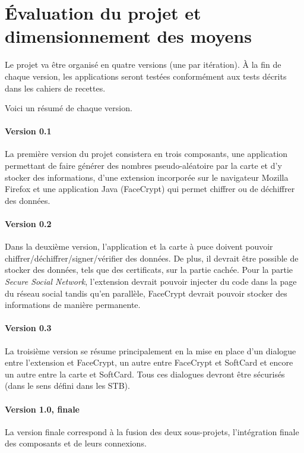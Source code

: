 \documentclass[a4paper,11pt,french]{article}
\begin{document}
\section{Évaluation du projet et dimensionnement des moyens}
Le projet va être organisé en quatre versions (une par itération).
À la fin de chaque version, les applications seront testées 
conformément aux tests décrits dans les cahiers de recettes.

Voici un résumé de chaque version.

\paragraph{Version 0.1} 
La première version du projet consistera en trois composants, une application
permettant de faire générer des nombres pseudo-aléatoire par la
carte et d'y stocker des informations, d'une extension incorporée sur 
le navigateur Mozilla Firefox et une application Java (FaceCrypt) qui permet chiffrer 
ou de déchiffrer des données.

\paragraph{Version 0.2}  
Dans la deuxième version, l'application et la carte à puce doivent pouvoir
chiffrer/déchiffrer/signer/vérifier des données. De plus, il devrait être possible
de stocker des données, tels que des certificats, sur la partie cachée. Pour la
partie \emph{Secure Social Network}, l'extension devrait pouvoir injecter
du code dans la page du réseau social tandis qu'en parallèle, FaceCrypt 
devrait pouvoir stocker des informations de manière permanente.

\paragraph{Version 0.3}
La troisième version se résume principalement en la mise en place
d'un dialogue entre l'extension et FaceCrypt, un autre entre FaceCrypt et 
SoftCard et encore un autre entre la carte et SoftCard. Tous ces dialogues
devront être sécurisés (dans le sens défini dans les STB).

\paragraph{Version 1.0, finale} 
La version finale correspond à la fusion des deux sous-projets, l'intégration
finale des composants et de leurs connexions.
\end{document}
